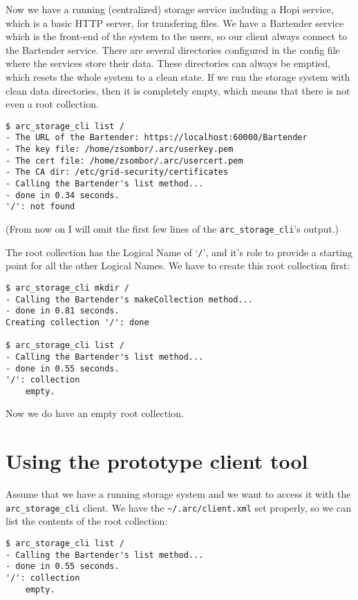 \documentclass{book}
\begin{document}
Now we have a running (centralized) storage service including a Hopi service, which is a basic HTTP server, for transfering files. We have a Bartender service which is the front-end of the system to the users, so our client always connect to the Bartender service. There are several directories configured in the config file where the services store their data. These directories can always be emptied, which resets the whole system to a clean state. If we run the storage system with clean data directories, then it is completely empty, which means that there is not even a root collection.

\begin{verbatim}
$ arc_storage_cli list /
- The URL of the Bartender: https://localhost:60000/Bartender
- The key file: /home/zsombor/.arc/userkey.pem
- The cert file: /home/zsombor/.arc/usercert.pem
- The CA dir: /etc/grid-security/certificates
- Calling the Bartender's list method...
- done in 0.34 seconds.
'/': not found
\end{verbatim}

(From now on I will omit the first few lines of the \verb!arc_storage_cli!'s output.)

The root collection has the Logical Name of `\verb!/!', and it's role to provide a starting point for all the other Logical Names. We have to create this root collection first:

\begin{verbatim}
$ arc_storage_cli mkdir /
- Calling the Bartender's makeCollection method...
- done in 0.81 seconds.
Creating collection '/': done

$ arc_storage_cli list /
- Calling the Bartender's list method...
- done in 0.55 seconds.
'/': collection
    empty.
\end{verbatim}

Now we do have an empty root collection.

\section{Using the prototype client tool} %

Assume that we have a running storage system and we want to access it with the \verb!arc_storage_cli! client. We have the \verb!~/.arc/client.xml! set properly, so we can list the contents of the root collection:

\begin{verbatim}
$ arc_storage_cli list /
- Calling the Bartender's list method...
- done in 0.55 seconds.
'/': collection
    empty.
\end{verbatim}
\end{document}
